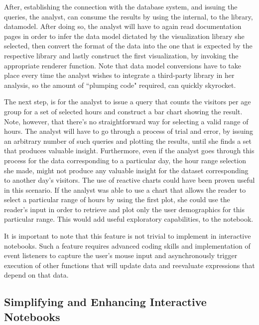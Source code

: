After, establishing the connection with the database system, and issuing the queries, the analyst, can consume the results by using the internal, to the library, datamodel. After doing so, the analyst will have to again read documentation pages in order to infer the data model dictated by the visualization library she selected, then convert the format of the data into the one that is expected by the respective library and lastly construct the first visualization, by invoking the appropriate renderer function. Note that data model conversions have to take place every time the analyst wishes to integrate a third-party library in her analysis, so the amount of ``plumping code" required, can quickly skyrocket.


The next step, is for the analyst to issue a query that counts the visitors per age group for a set of selected hours and construct a bar chart showing the result. Note, however, that there's no straightforward way for selecting a valid range of hours. The analyst will have to go through a process of trial and error, by issuing an arbitrary number of such queries and plotting the results, until she finds a set that produces valuable insight. Furthermore, even if the analyst goes through this process for the data corresponding to a particular day, the hour range selection she made, might not produce any valuable insight for the dataset corresponding to another day's visitors. The use of reactive charts could have been proven useful in this scenario. If the analyst was able to use a chart that allows the reader to select a particular range of hours by using the first plot, she could use the reader's input in order to retrieve and plot only the user demographics for this particular range. This would add useful exploratory capabilities, to the notebook.

It is important to note that this feature is not trivial to implement in interactive notebooks. Such a feature requires advanced coding skills and implementation of event listeners to capture the user's mouse input and asynchronously trigger execution of other functions that will update data and reevaluate expressions that depend on that data. 

\subsection{Simplifying and Enhancing Interactive Notebooks}

